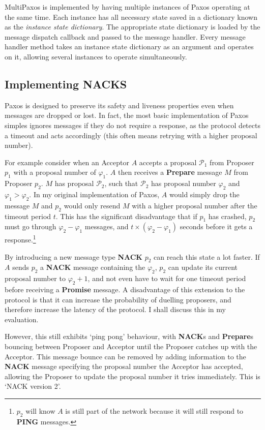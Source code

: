 \documentclass[12pt,twoside,notitlepage]{report}
\newcommand{\msg}[1] {{\bf #1}}         %
\begin{document}
MultiPaxos is implemented by having multiple instances of Paxos operating at the same time. Each
instance has all necessary state saved in a dictionary known as the \emph{instance state
dictionary}. The appropriate state dictionary is loaded by the message dispatch callback and
passed to the message handler. Every message handler method takes an instance state dictionary as
an argument and operates on it, allowing several instances to operate simultaneously.

\subsection{Implementing NACKS}

\label{sec:nacks}

Paxos is designed to preserve its safety and liveness properties even when messages are dropped or
lost. In fact, the most basic implementation of Paxos simples ignores messages if they do not
require a response, as the protocol detects a timeout and acts accordingly (this often means
retrying with a higher proposal number).

For example consider when an Acceptor $A$ accepts a proposal $\mathcal{P}_1$ from Proposer $p_1$
with a proposal number of $\varphi_1$. $A$ then receives a \msg{Prepare} message $M$ from Proposer
$p_2$. $M$ has proposal $\mathcal{P}_2$, such that $\mathcal{P}_2$ has proposal number $\varphi_2$
and $\varphi_1 > \varphi_2$. In my original implementation of Paxos, $A$ would simply drop the
message $M$ and $p_2$ would only resend $M$ with a higher proposal number after the timeout period
$t$.  This has the significant disadvantage that if $p_1$ has crashed, $p_2$ must go through
$\varphi_2 - \varphi_1$ messages, and $t\times (\varphi_2 - \varphi_1)$ seconds before it gets a
response.\footnote{$p_2$ will know $A$ is still part of the network because it will still respond
to \msg{PING} messages.}

By introducing a new message type \msg{NACK} $p_2$ can reach this state a lot faster. If $A$ sends
$p_2$ a \msg{NACK} message containing the $\varphi_2$, $p_2$ can update its current proposal
number to $\varphi_2 + 1$, and not even have to wait for one timeout period before receiving a
\msg{Promise} message. A disadvantage of this extension to the protocol is that it can increase
the probability of duelling proposers, and therefore increase the latency of the protocol. I shall
discuss this in my evaluation.

However, this still exhibits `ping pong' behaviour, with \msg{NACK}s and \msg{Prepare}s bouncing
between Proposer and Acceptor until the Proposer catches up with the Acceptor. This message bounce
can be removed by adding information to the \msg{NACK} message specifying the proposal number the
Acceptor has accepted, allowing the Proposer to update the proposal number it tries immediately.
This is `NACK version 2'.
\end{document}
